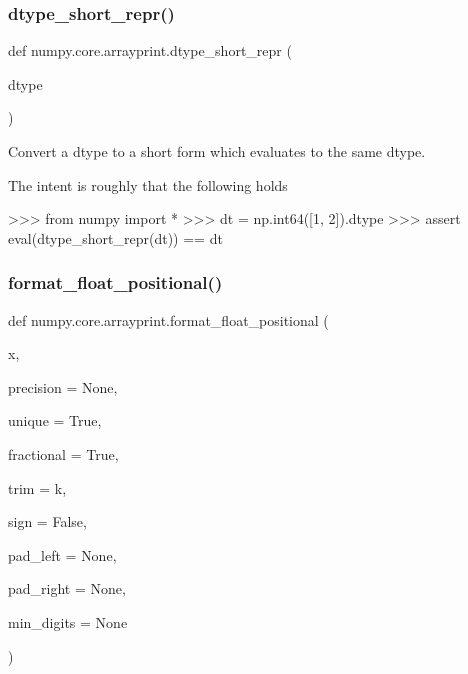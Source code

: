 \subsubsection{\texorpdfstring{dtype\+\_\+short\+\_\+repr()}{dtype\_short\_repr()}}
{\footnotesize\ttfamily def numpy.\+core.\+arrayprint.\+dtype\+\_\+short\+\_\+repr (\begin{DoxyParamCaption}\item[{}]{dtype }\end{DoxyParamCaption})}

\begin{DoxyVerb}Convert a dtype to a short form which evaluates to the same dtype.

The intent is roughly that the following holds

>>> from numpy import *
>>> dt = np.int64([1, 2]).dtype
>>> assert eval(dtype_short_repr(dt)) == dt
\end{DoxyVerb}
 \mbox{\label{namespacenumpy_1_1core_1_1arrayprint_a8a77078d071937fb9e895ab6b86bc09c}} 
\subsubsection{\texorpdfstring{format\+\_\+float\+\_\+positional()}{format\_float\_positional()}}
{\footnotesize\ttfamily def numpy.\+core.\+arrayprint.\+format\+\_\+float\+\_\+positional (\begin{DoxyParamCaption}\item[{}]{x,  }\item[{}]{precision = {\ttfamily None},  }\item[{}]{unique = {\ttfamily True},  }\item[{}]{fractional = {\ttfamily True},  }\item[{}]{trim = {\ttfamily \textquotesingle{}k\textquotesingle{}},  }\item[{}]{sign = {\ttfamily False},  }\item[{}]{pad\+\_\+left = {\ttfamily None},  }\item[{}]{pad\+\_\+right = {\ttfamily None},  }\item[{}]{min\+\_\+digits = {\ttfamily None} }\end{DoxyParamCaption})}

